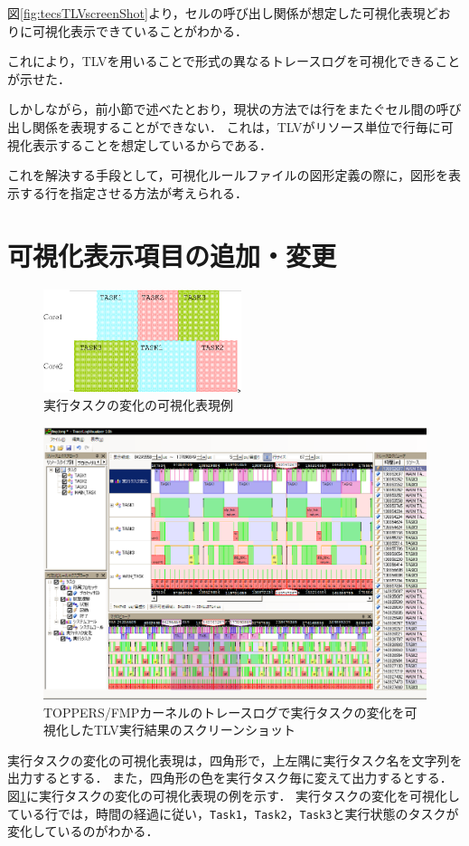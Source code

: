 図\ref{fig:tecsTLVscreenShot}より，セルの呼び出し関係が想定した可視化表現どおりに可視化表示できていることがわかる．

これにより，TLVを用いることで形式の異なるトレースログを可視化できることが示せた．

しかしながら，前小節で述べたとおり，現状の方法では行をまたぐセル間の呼び出し関係を表現することができない．
これは，TLVがリソース単位で行毎に可視化表示することを想定しているからである．

これを解決する手段として，可視化ルールファイルの図形定義の際に，図形を表示する行を指定させる方法が考えられる．



\section{可視化表示項目の追加・変更}

\begin{figure}[t]
\begin{center}
\includegraphics[height=3cm]{img/runningTaskChangeVisual.eps}
\caption{実行タスクの変化の可視化表現例}
\label{fig:runningTaskChangeVisual}
\end{center}
\end{figure}

\begin{figure}[!h]
\begin{center}
\includegraphics[width=15cm]{img/fmpRunTaskTLVscreenShot.eps}
\caption{TOPPERS/FMPカーネルのトレースログで実行タスクの変化を可視化したTLV実行結果のスクリーンショット}
\label{fig:fmppTLVscreenShot}
\end{center}
\end{figure}

実行タスクの変化の可視化表現は，四角形で，上左隅に実行タスク名を文字列を出力するとする．
また，四角形の色を実行タスク毎に変えて出力するとする．
図\ref{fig:runningTaskChangeVisual}に実行タスクの変化の可視化表現の例を示す．
実行タスクの変化を可視化している行では，時間の経過に従い，{\tt Task1}，{\tt Task2}，{\tt Task3}と実行状態のタスクが変化しているのがわかる．
\fi